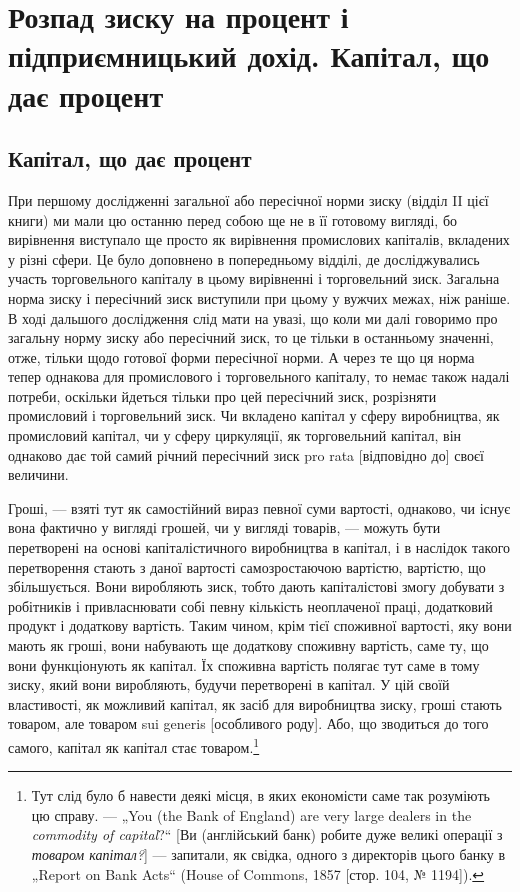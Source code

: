 \chapter{Розпад зиску на процент і підприємницький
дохід. Капітал, що дає процент}

\section{Капітал, що дає процент}

При першому дослідженні загальної або пересічної норми
зиску (відділ II цієї книги) ми мали цю останню перед собою
ще не в її готовому вигляді, бо вирівнення виступало ще просто
як вирівнення промислових капіталів, вкладених у різні сфери.
Це було доповнено в попередньому відділі, де досліджувались
участь торговельного капіталу в цьому вирівненні і торговельний
зиск. Загальна норма зиску і пересічний зиск виступили
при цьому у вужчих межах, ніж раніше. В ході дальшого
дослідження слід мати на увазі, що коли ми далі говоримо
про загальну норму зиску або пересічний зиск, то це тільки
в останньому значенні, отже, тільки щодо готової форми пересічної
норми. А через те що ця норма тепер однакова для промислового
і торговельного капіталу, то немає також надалі
потреби, оскільки йдеться тільки про цей пересічний зиск,
розрізняти промисловий і торговельний зиск. Чи вкладено капітал
у сферу виробництва, як промисловий капітал, чи у сферу циркуляції,
як торговельний капітал, він однаково дає той самий
річний пересічний зиск pro rata [відповідно до] своєї величини.

Гроші, — взяті тут як самостійний вираз певної суми вартості,
однаково, чи існує вона фактично у вигляді грошей, чи у
вигляді товарів, — можуть бути перетворені на основі капіталістичного
виробництва в капітал, і в наслідок такого перетворення
стають з даної вартості самозростаючою вартістю, вартістю,
що збільшується. Вони виробляють зиск, тобто дають
капіталістові змогу добувати з робітників і привласнювати собі
певну кількість неоплаченої праці, додатковий продукт і додаткову
вартість. Таким чином, крім тієї споживної вартості, яку
вони мають як гроші, вони набувають ще додаткову споживну
вартість, саме ту, що вони функціонують як капітал. Їх споживна
вартість полягає тут саме в тому зиску, який вони виробляють,
будучи перетворені в капітал. У цій своїй властивості,
як можливий капітал, як засіб для виробництва зиску, гроші
стають товаром, але товаром sui generis [особливого роду].
Або, що зводиться до того самого, капітал як капітал стає
товаром.\footnote{
Тут слід було б навести деякі місця, в яких економісти саме так розуміють
цю справу. — „You (the Bank of England) are very large dealers in the
\emph{commodity of capital}?“ [Ви (англійський банк) робите дуже великі операції
з \emph{товаром капітал?}] — запитали, як свідка, одного з директорів цього банку
в „Report on Bank Acts“ (House of Commons, 1857 [стор. 104, № 1194]).
}

